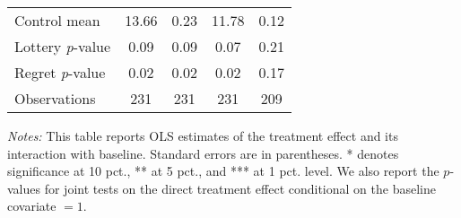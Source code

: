 \begin{table}[htbp]
{\begin{threeparttable}
\begin{tabular}{l*{4}{c}}
Control mean    &    13.66         &     0.23         &    11.78         &     0.12         \\
Lottery \emph{p}-value&     0.09         &     0.09         &     0.07         &     0.21         \\
Regret \emph{p}-value&     0.02         &     0.02         &     0.02         &     0.17         \\
Observations    &      231         &      231         &      231         &      209         \\
\bottomrule \end{tabular} \begin{tablenotes}[flushleft] \footnotesize \item \emph{Notes:} This table reports OLS estimates of the treatment effect and its interaction with baseline. Standard errors are in parentheses. * denotes significance at 10 pct., ** at 5 pct., and *** at 1 pct. level. We also report the \(p\)-values for joint tests on the direct treatment effect conditional on the baseline covariate $= 1$. \end{tablenotes} \end{threeparttable} } \end{table}

